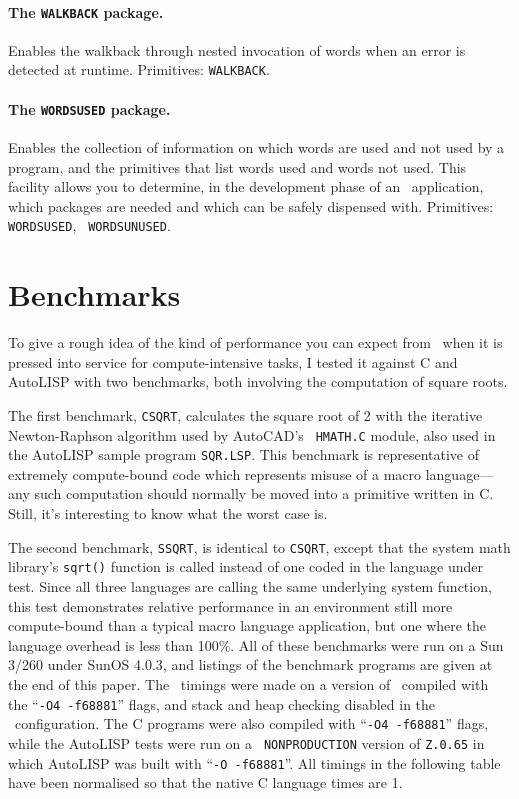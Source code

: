 \documentclass[twocolumn]{article}
\begin{document}
\paragraph{The {\tt WALKBACK} package.}
\label{`wback'}
Enables the walkback through nested invocation of words when an error
is detected at runtime.  Primitives: {\tt WALKBACK}.

\paragraph{The {\tt WORDSUSED} package.}
\label{`wordsused'}
Enables the collection of information on which words are used and not
used by a program, and the primitives that list words used and words
not used.  This facility allows you to determine, in the development
phase of an \atlast\ application, which packages are needed and which
can be safely dispensed with.  Primitives: {\tt WORDSUSED}, {\tt
WORDSUNUSED}.

\section{Benchmarks}

To give a rough idea of the kind of performance you can expect from
\atlast\ when it is pressed into service for compute-intensive tasks,
I tested it against C and AutoLISP with two benchmarks, both involving
the computation of square roots.

The first benchmark, {\tt CSQRT}, calculates the square root of 2
with the iterative Newton-Raphson algorithm used by AutoCAD's {\tt
HMATH.C} module, also used in the AutoLISP sample program
{\tt SQR.LSP}\@.  This benchmark is representative of extremely
compute-bound code which represents misuse of a macro language---any
such computation should normally be moved into a primitive written in
C\@.  Still, it's interesting to know what the worst case is.

The second benchmark, {\tt SSQRT}, is identical to {\tt CSQRT}, except
that the system math library's {\tt sqrt()} function is called instead
of one coded in the language under test.  Since all three languages
are calling the same underlying system function, this test
demonstrates relative performance in an environment still more
compute-bound than a typical macro language application, but one where the
language overhead is less than 100\%.  All of these benchmarks were 
run on a Sun 3/260 under SunOS 4.0.3, and listings of the benchmark
programs are given at the end of this paper.  The \atlast\ timings were
made on a version of \atlast\ compiled with the ``{\tt -O4 -f68881}''
flags, and stack and heap checking disabled in the \atlast\
configuration.  The C programs were also compiled with ``{\tt -O4
-f68881}'' flags, while the AutoLISP tests were run on a {\tt
NONPRODUCTION} version of {\tt Z.0.65} in which AutoLISP was built
with ``{\tt -O -f68881}''.  All timings in the following table have
been normalised so that the native C language times are 1.
\end{document}
